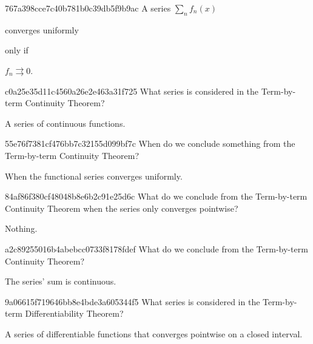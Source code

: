 \begin{note}{767a398cce7c40b781b0c39db5f9b9ac}
    A series \({ \sum_n f_n(x) }\) \begin{icloze}{2}converges uniformly\end{icloze} \begin{icloze}{3}only if\end{icloze} \begin{icloze}{1}\({ f_n \rightrightarrows 0 }\).\end{icloze}
\end{note}

\begin{note}{c0a25e35d11c4560a26e2e463a31f725}
    What series is considered in the Term-by-term Continuity Theorem?

    \begin{cloze}{1}
        A series of continuous functions.
    \end{cloze}
\end{note}

\begin{note}{55e76f7381cf476bb7c32155d099bf7c}
    When do we conclude something from the Term-by-term Continuity Theorem?

    \begin{cloze}{1}
        When the functional series converges uniformly.
    \end{cloze}
\end{note}

\begin{note}{84af86f380cf48048b8e6b2c91e25d6c}
    What do we conclude from the Term-by-term Continuity Theorem when the series only converges pointwise?

    \begin{cloze}{1}
        Nothing.
    \end{cloze}
\end{note}

\begin{note}{a2c89255016b4abebcc0733f8178fdef}
    What do we conclude from the Term-by-term Continuity Theorem?

    \begin{cloze}{1}
        The series' sum is continuous.
    \end{cloze}
\end{note}

\begin{note}{9a06615f719646bb8e4bde3a605344f5}
    What series is considered in the Term-by-term Differentiability Theorem?

    \begin{cloze}{1}
        A series of differentiable functions that converges pointwise on a closed interval.
    \end{cloze}
\end{note}

